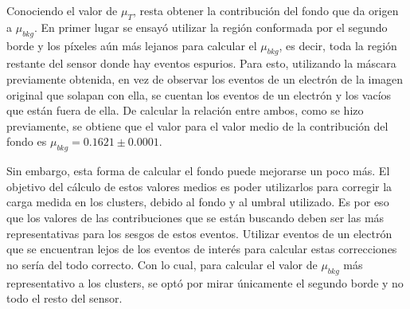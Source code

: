 Conociendo el valor de $\mu_{T}$, resta obtener la contribución del fondo que da origen a $\mu_{bkg}$. En primer lugar se ensayó utilizar la región conformada por el segundo borde y los píxeles aún más lejanos para calcular el $\mu_{bkg}$, es decir, toda la región restante del sensor donde hay eventos espurios. Para esto, utilizando la máscara previamente obtenida, en vez de observar los eventos de un electrón de la imagen original que solapan con ella, se cuentan los eventos de un electrón y los vacíos que están fuera de ella. De calcular la relación entre ambos, como se hizo previamente, se obtiene que el valor para el valor medio de la contribución del fondo es $\mu_{bkg} = 0.1621 \pm 0.0001$. 

Sin embargo, esta forma de calcular el fondo puede mejorarse un poco más. El objetivo del cálculo de estos valores medios es poder utilizarlos para corregir la carga medida en los clusters, debido al fondo y al umbral utilizado. Es por eso que los valores de las contribuciones que se están buscando deben ser las más representativas para los sesgos de estos eventos. Utilizar eventos de un electrón que se encuentran lejos de los eventos de interés para calcular estas correcciones no sería del todo correcto. Con lo cual, para calcular el valor de $\mu_{bkg}$ más representativo a los clusters, se optó por mirar únicamente el segundo borde y no todo el resto del sensor.

